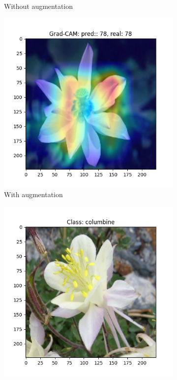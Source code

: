\begin{figure}[h!]
\begin{subfigure}[b]{0.24\textwidth}
        \caption{Without augmentation}
    \end{subfigure}
    \hfill
    \begin{subfigure}[b]{0.24\textwidth}
        \centering
        \includegraphics[width=\textwidth]{Images/saliency-flowers/172/GradCAM_172_aug.png}
        \caption{With augmentation}
    \end{subfigure}
    \hfill
    \begin{subfigure}[b]{0.24\textwidth}
        \centering
        \includegraphics[width=\textwidth]{Images/saliency-flowers/172/image_320_wrong.png}

\end{subfigure}
\end{figure}
